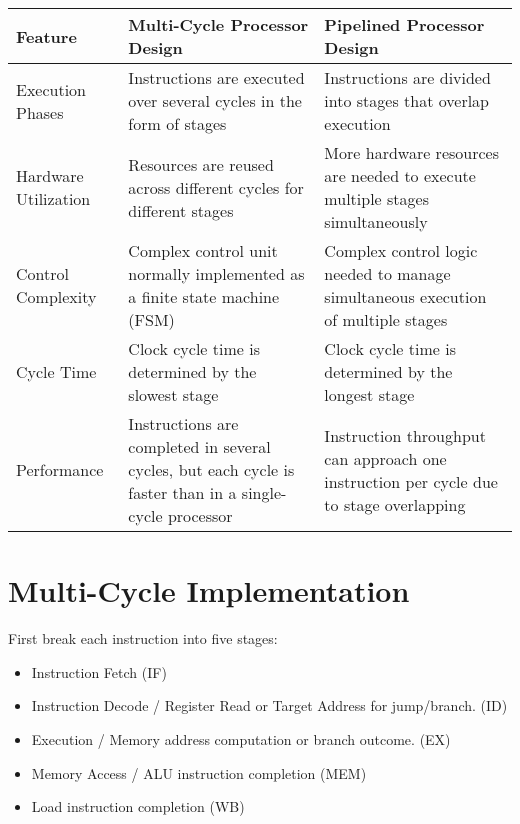 \documentclass[12pt letter]{report}
\begin{document}
\begin{table}[h!]
  \begin{center}
    \begin{tabularx}{\textwidth}{|X|X|X|}
      \hline
      \textbf{Feature}     & \textbf{Multi-Cycle Processor Design}                                                                   & \textbf{Pipelined Processor Design}                                                    \\ [0.5ex]
      \hline
      \hline
      Execution Phases     & Instructions are executed over several cycles in the form of stages                                     & Instructions are divided into stages that overlap execution                            \\
      \hline
      Hardware Utilization & Resources are reused across different cycles for different stages                                       & More hardware resources are needed to execute multiple stages simultaneously           \\
      \hline
      Control Complexity   & Complex control unit normally implemented as a finite state machine (FSM)                               & Complex control logic needed to manage simultaneous execution of multiple stages       \\
      \hline
      Cycle Time           & Clock cycle time is determined by the slowest stage                                                     & Clock cycle time is determined by the longest stage                                    \\
      \hline
      Performance          & Instructions are completed in several cycles, but each cycle is faster than in a single-cycle processor & Instruction throughput can approach one instruction per cycle due to stage overlapping \\
      \hline
    \end{tabularx}
  \end{center}
\end{table}

\section{Multi-Cycle Implementation}

First break each instruction into five stages:
\begin{itemize}
  \item Instruction Fetch (IF)
  \item Instruction Decode / Register Read or Target Address for jump/branch. (ID)
  \item Execution / Memory address computation or branch outcome. (EX)
  \item Memory Access / ALU instruction completion (MEM)
  \item Load instruction completion (WB)
\end{itemize}
\end{document}
